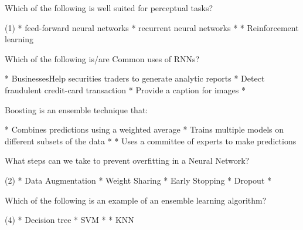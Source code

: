 \documentclass[11pt]{extarticle}
\begin{document}
\begin{exercise}
    Which of the following is well suited for perceptual tasks?
    \begin{choice} (1)
        * feed-forward neural networks
        * recurrent neural networks
        * 
        * Reinforcement learning
    \end{choice}
\end{exercise}
\begin{solution}
\end{solution}

\begin{exercise}
    Which of the following is/are Common uses of RNNs?
    \begin{choice}
        * BusinessesHelp securities traders to generate analytic reports
        * Detect fraudulent credit-card transaction
        * Provide a caption for images
        * 
    \end{choice}
\end{exercise}
\begin{solution}
\end{solution}

\begin{exercise}
    Boosting is an ensemble technique that:
    \begin{choice}
        * Combines predictions using a weighted average
        * Trains multiple models on different subsets of the data
        * 
        * Uses a committee of experts to make predictions
    \end{choice}
\end{exercise}
\begin{solution}
\end{solution}

\begin{exercise}
    What steps can we take to prevent overfitting in a Neural Network?
    \begin{choice}(2)
        * Data Augmentation
        * Weight Sharing
        * Early Stopping
        * Dropout
        * 
    \end{choice}
\end{exercise}
\begin{solution}
\end{solution}

\begin{exercise}
    Which of the following is an example of an ensemble learning algorithm?
    \begin{choice} (4)
        * Decision tree
        * SVM
        * 
        * KNN
    \end{choice}
\end{exercise}
\begin{solution}
\end{solution}
\end{document}
